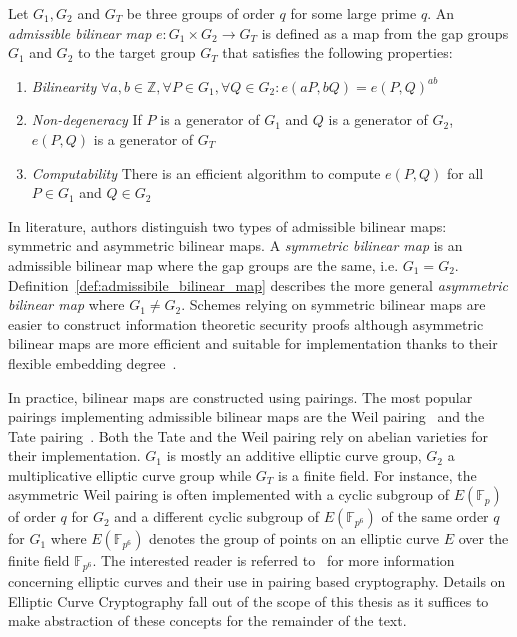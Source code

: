 \begin{defn}
\label{def:admissibile_bilinear_map}
 Let $G_1, G_2$ and $G_T$ be three groups of order $q$ for some large prime $q$. An \textit{admissible bilinear map} $e: G_1 \times G_2 \rightarrow G_T$ is defined as a map from the gap groups $G_1$ and $G_2$ to the target group $G_T$ that satisfies the following properties:
 \begin{enumerate}
  \item \textit{Bilinearity} $\forall a, b \in \mathbb{Z}, \forall P \in G_1, \forall Q \in G_2: e \left( aP, bQ \right) = e \left( P, Q \right)^{ab}$
  \item \textit{Non-degeneracy} If $P$ is a generator of $G_1$ and $Q$ is a generator of $G_2$, $e \left( P, Q \right)$ is a generator of $G_T$
  \item \textit{Computability} There is an efficient algorithm to compute $e \left( P, Q \right)$ for all $P \in G_1$ and $Q \in G_2$
 \end{enumerate}

\end{defn}

In literature, authors distinguish two types of admissible bilinear maps: symmetric and asymmetric bilinear maps. A \textit{symmetric bilinear map} is an admissible bilinear map where the gap groups are the same, i.e. $G_1 = G_2$. Definition~\ref{def:admissibile_bilinear_map} describes the more general \textit{asymmetric bilinear map} where $G_1 \neq G_2$. Schemes relying on symmetric bilinear maps are easier to construct information theoretic security proofs although asymmetric bilinear maps are more efficient and suitable for implementation thanks to their flexible embedding degree~\cite{art:BonehF01,art:ZhangW13}.

In practice, bilinear maps are constructed using pairings. The most popular pairings implementing admissible bilinear maps are the Weil pairing~\cite{art:BonehF01} and the Tate pairing~\cite{art:FreyMR99}. Both the Tate and the Weil pairing rely on abelian varieties for their implementation. $G_1$ is mostly an additive elliptic curve group, $G_2$ a multiplicative elliptic curve group while $G_T$ is a finite field. For instance, the asymmetric Weil pairing is often implemented with a cyclic subgroup of $E\left( \mathbb{F}_p \right)$ of order $q$ for $G_2$ and a different cyclic subgroup of $E \left( \mathbb{F}_{p^6} \right)$ of the same order $q$ for $G_1$ where $E\left( \mathbb{F}_{p^6} \right)$ denotes the group of points on an elliptic curve $E$ over the finite field $\mathbb{F}_{p^6}$. The interested reader is referred to~\cite{thesis:Maas04} for more information concerning elliptic curves and their use in pairing based cryptography. Details on Elliptic Curve Cryptography fall out of the scope of this thesis as it suffices to make abstraction of these concepts for the remainder of the text.

